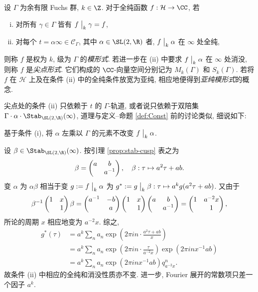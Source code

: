 \begin{definition}\label{def:modular-form-gen}
	   
	设 $\Gamma$ 为余有限 Fuchs 群, $k \in \Z$. 对于全纯函数 $f: \mathcal{H} \to \CC$, 若
	\begin{enumerate}[(i)]
		\item 对所有 $\gamma \in \Gamma$ 皆有 $f \;\big|_{k} \; \gamma = f$,
		\item 对每个 $t = \alpha\infty \in \mathcal{C}_\Gamma$, 其中 $\alpha \in \SL(2,\R)$ 者, $f\;\big|_{k} \;\alpha$ 在 $\infty$ 处全纯,
	\end{enumerate}
	则称 $f$ 是权为 $k$, 级为 $\Gamma$ 的\emph{模形式}. 若进一步在 (ii) 中要求 $f \;\big|_{k} \; \alpha$ 在 $\infty$ 处消没, 则称 $f$ 是\emph{尖点形式}. 它们构成的 $\CC$-向量空间分别记为 $M_k(\Gamma)$ 和 $S_k(\Gamma)$. 若将 $f$ 在 $\mathcal{H}$ 上及在条件 (ii) 中的全纯条件放宽为亚纯, 相应地便得到\emph{亚纯模形式}的概念.
\end{definition}

尖点处的条件 (ii) 只依赖于 $t$ 的 $\Gamma$-轨道, 或者说只依赖于双陪集 $\Gamma \cdot \alpha \cdot \Stab_{\SL(2,\R)}(\infty)$, 道理与定义--命题 \ref{def:Const} 前的讨论类似, 细说如下:
\begin{compactitem}
	\item 基于条件 (i), 将 $\alpha$ 左乘以 $\Gamma$ 的元素不改变 $f \;\big|_{k} \; \alpha$.
	\item 设 $\beta \in \Stab_{\SL(2,\R)}(\infty)$. 按引理 \ref{prop:stab-cusp} 表之为
	\[ \beta = \begin{pmatrix} a & b \\  & a^{-1} \end{pmatrix}, \quad \beta: \tau \mapsto a^2 \tau + ab. \]
	变 $\alpha$ 为 $\alpha\beta$ 相当于变 $g := f \;\big|_{k} \; \alpha$ 为 $g^* := g \;\big|_{k} \; \beta: \tau \mapsto a^k g(a^2 \tau + ab)$. 又由于
	\[ \beta^{-1} \begin{pmatrix} 1 & x \\  & 1 \end{pmatrix} \beta = \begin{pmatrix} a^{-1} & -b \\  & a \end{pmatrix} \begin{pmatrix} 1 & x \\  & 1 \end{pmatrix} \begin{pmatrix} a & b \\  & a^{-1} \end{pmatrix} = \begin{pmatrix} 1 & a^{-2} x \\  & 1 \end{pmatrix}, \]
	所论的周期 $x$ 相应地变为 $a^{-2} x$. 综之,
	\begin{align*}
		g^*(\tau) & = a^k \sum_n a_n \exp\left( 2\pi i n \cdot \frac{a^2 \tau + ab}{x} \right) \\
		& = a^k \sum_n a_n \exp\left( 2\pi i n \cdot \frac{\tau}{a^{-2}x} \right) \exp\left( 2\pi i n x^{-1} ab \right) \\
		& = a^k \sum_n a_n \exp\left( 2\pi i n x^{-1} ab \right) q_{a^{-2}x}^n.
	\end{align*}
	故条件 (ii) 中相应的全纯和消没性质亦不变. 进一步, Fourier 展开的常数项只差一个因子 $a^k$.
\end{compactitem}

